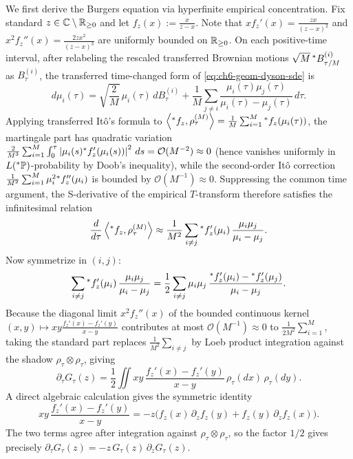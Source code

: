 \begin{proofsketch}
We first derive the Burgers equation via hyperfinite empirical concentration. Fix standard $z \in \mathbb{C} \setminus \mathbb{R}_{\ge 0}$ and let $f_z(x) := \frac{x}{z - x}$. Note that $x f_z'(x) = \frac{z x}{(z - x)^2}$ and $x^2 f_z''(x) = \frac{2 z x^2}{(z - x)^3}$ are uniformly bounded on $\mathbb{R}_{\ge 0}$. On each positive-time interval, after relabeling the rescaled transferred Brownian motions $\sqrt{M}\,{}^*B_{\tau/M}^{(i)}$ as $B_\tau^{(i)}$, the transferred time-changed form of \eqref{eq:ch6-geom-dyson-sde} is
\begin{equation}
\label{eq:ch6-time-changed-dyson}
d\mu_i(\tau) = \sqrt{\frac{2}{M}}\,\mu_i(\tau)\,dB_\tau^{(i)} + \frac{1}{M}\sum_{j \neq i} \frac{\mu_i(\tau)\mu_j(\tau)}{\mu_i(\tau) - \mu_j(\tau)}\,d\tau.
\end{equation}
Applying transferred It\^o's formula to $\left\langle {}^*f_z, \rho_\tau^{(M)} \right\rangle = \frac{1}{M}\sum_{i=1}^M {}^*f_z(\mu_i(\tau))$, the martingale part has quadratic variation $\frac{2}{M^3}\sum_{i=1}^M \int_0^\tau \left\lvert \mu_i(s){}^*f_z'(\mu_i(s)) \right\rvert^2\,ds = \mathcal{O}(M^{-2}) \approx 0$ (hence vanishes uniformly in $L({}^*\mathbb{P})$-probability by Doob's inequality), while the second-order It\^o correction $\frac{1}{M^2}\sum_{i=1}^M \mu_i^2 {}^*f_z''(\mu_i)$ is bounded by $\mathcal{O}(M^{-1}) \approx 0$. Suppressing the common time argument, the S-derivative of the empirical $T$-transform therefore satisfies the infinitesimal relation
\begin{equation}
\label{eq:ch6-emp-s-deriv}
\frac{d}{d\tau}\left\langle {}^*f_z, \rho_\tau^{(M)} \right\rangle \approx \frac{1}{M^2}\sum_{i \neq j} {}^*f_z'(\mu_i)\,\frac{\mu_i \mu_j}{\mu_i - \mu_j}.
\end{equation}
Now symmetrize in $(i, j)$:
\begin{equation}
\label{eq:ch6-symmetrize-dyson}
\sum_{i \neq j} {}^*f_z'(\mu_i)\,\frac{\mu_i \mu_j}{\mu_i - \mu_j}
= \frac{1}{2}\sum_{i \neq j} \mu_i \mu_j\,\frac{{}^*f_z'(\mu_i) - {}^*f_z'(\mu_j)}{\mu_i - \mu_j}.
\end{equation}
Because the diagonal limit $x^2 f_z''(x)$ of the bounded continuous kernel $(x, y) \mapsto xy \frac{f_z'(x) - f_z'(y)}{x - y}$ contributes at most $\mathcal{O}(M^{-1}) \approx 0$ to $\frac{1}{2M^2}\sum_{i=1}^M$, taking the standard part replaces $\frac{1}{M^2}\sum_{i \neq j}$ by Loeb product integration against the shadow $\rho_\tau \otimes \rho_\tau$, giving
\begin{equation}
\label{eq:ch6-double-integral-burgers}
\partial_\tau G_\tau(z) = \frac{1}{2}\iint xy\,\frac{f_z'(x) - f_z'(y)}{x - y}\,\rho_\tau(dx)\,\rho_\tau(dy).
\end{equation}
A direct algebraic calculation gives the symmetric identity
\begin{equation}
\label{eq:ch6-fz-algebraic}
xy\,\frac{f_z'(x) - f_z'(y)}{x - y} = -z\bigl(f_z(x)\,\partial_z f_z(y) + f_z(y)\,\partial_z f_z(x)\bigr).
\end{equation}
The two terms agree after integration against $\rho_\tau \otimes \rho_\tau$, so the factor $1/2$ gives precisely $\partial_\tau G_\tau(z) = -z\,G_\tau(z)\,\partial_z G_\tau(z)$.


\end{proofsketch}
